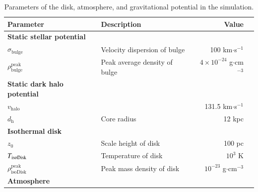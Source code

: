 \documentclass[twocolumn]{aastex631}
\begin{document}
\begin{table}[t]
\centering
\caption{Parameters of the disk, atmosphere, and gravitational potential in the simulation.}
\label{table-parameters}
\begin{tabular}{@{}llrc@{}}
\toprule[1pt]\midrule[0.3pt]
Parameter                                                    & Description                               & Value                                \\ \midrule
{\bf Static stellar potential }\citep{velocity-dispersion-MW}&                                           &                                      \\
$\sigma_{\text{bulge}}$                                      & Velocity dispersion of bulge              & 100 km$\cdot$s$^{-1}$                \\
$\rho_{\text{bulge}}^{\text{peak}}$                          & Peak average density of bulge             & $4\times 10^{-24}$ g$\cdot$cm$^{-3}$ \\ \hline
{\bf Static dark halo potential }\citep{Johnston1995}        &                                           &                                      \\
$v_{\text{halo}}$                                            &                                           & 131.5 km$\cdot$s$^{-1}$              \\
$d_{\text{h}}$                                               & Core radius                               & 12 kpc                               \\ \hline
{\bf Isothermal disk }\citep{peak-ism-density}               &                                           &                                      \\
$z_{0}$                                                      & Scale height of disk                      & 100 pc                               \\
$T_{\text{\text{isoDisk}}}$                                  & Temperature of disk                       & $10^{3}$ K                           \\
$\rho_{\text{isoDisk}}^{\text{peak}}$                        & Peak mass density of disk                 & $10^{-23}$ g$\cdot$cm$^{-3}$         \\ \hline
{\bf Atmosphere }\citep{temperature-MW}                      &                                           &                                      \\

\end{tabular}
\end{table}
\end{document}
